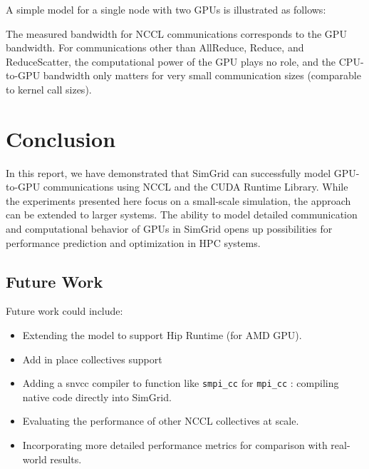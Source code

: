 \documentclass[11pt,a4paper]{article}
\begin{document}
A simple model for a single node with two GPUs is illustrated as follows:


The measured bandwidth for NCCL communications corresponds to the GPU bandwidth. For 
communications other than AllReduce, Reduce, and ReduceScatter, the computational power 
of the GPU plays no role, and the CPU-to-GPU bandwidth only matters for very small 
communication sizes (comparable to kernel call sizes).

\section{Conclusion}
In this report, we have demonstrated that SimGrid can successfully model GPU-to-GPU 
communications using NCCL and the CUDA Runtime Library. While the experiments presented 
here focus on a small-scale simulation, the approach can be extended to larger systems. 
The ability to model detailed communication and computational behavior of GPUs in SimGrid 
opens up possibilities for performance prediction and optimization in HPC systems.

\subsection{Future Work}
Future work could include:
\begin{itemize}
    \item Extending the model to support Hip Runtime (for AMD GPU).
    \item Add in place collectives support
    \item Adding a snvcc compiler to function like \texttt{smpi\_cc} for \texttt{mpi\_cc} : compiling native code directly into SimGrid.
    \item Evaluating the performance of other NCCL collectives at scale.
    \item Incorporating more detailed performance metrics for comparison with real-world results.
\end{itemize}




\end{document}

